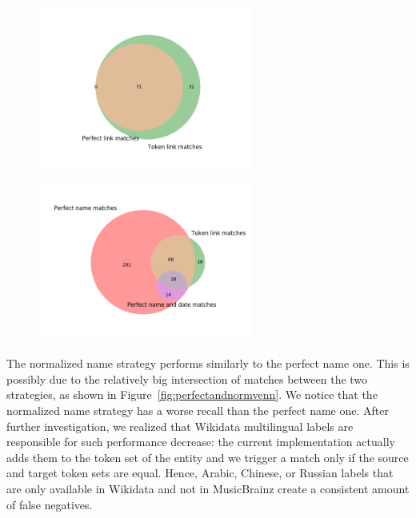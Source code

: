 \begin{figure}[h]
  \begin{center}
   \includegraphics[height=200px]{images/plots/links.png}
   \label{fig:linksvenn}
  \end{center}
\end{figure}

\begin{figure}[h]
  \begin{center}
   \includegraphics[height=200px]{images/plots/perfname_tlink_perfnamedate.png}
   \label{fig:perfectsandtlinkvenn}
  \end{center}
\end{figure}

The normalized name strategy performs similarly to the perfect name one. This is possibly due to the relatively big intersection of matches between the two strategies, as shown in Figure~\ref{fig:perfectandnormvenn}.
We notice that the normalized name strategy has a worse recall than the perfect name one. After further investigation, we realized that Wikidata multilingual labels are responsible for such performance decrease: the current implementation actually adds them to the token set of the entity and we trigger a match only if the source and target token sets are equal.
Hence, Arabic, Chinese, or Russian labels that are only available in Wikidata and not in MusicBrainz create a consistent amount of false negatives.

